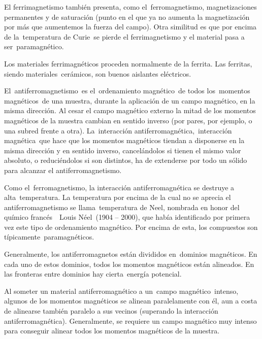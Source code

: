 \begin{footnotesize}
El ferrimagnetismo también presenta, como el ferromagnetismo, magnetizaciones permanentes y de saturación (punto en el que ya no aumenta la magnetización por más que aumentemos la fuerza del campo). Otra similitud es que por encima de la temperatura de Curie se pierde el ferrimagnetismo y el material pasa a ser paramagnético.

Los materiales ferrimagnéticos proceden normalmente de la ferrita. Las ferritas, siendo materiales cerámicos, son buenos aislantes eléctricos. 

El antiferromagnetismo es el ordenamiento magnético de todos los momentos magnéticos de una muestra, durante la aplicación de un campo magnético, en la misma dirección. Al cesar el campo magnético externo la mitad de los momentos magnéticos de la muestra cambian en sentido inverso (por pares, por ejemplo, o una subred frente a otra). La interacción antiferromagnética, interacción magnética que hace que los momentos magnéticos tiendan a disponerse en la misma dirección y en sentido inverso, cancelándolos si tienen el mismo valor absoluto, o reduciéndolos si son distintos, ha de extenderse por todo un sólido para alcanzar el antiferromagnetismo.

Como el ferromagnetismo, la interacción antiferromagnética se destruye a alta temperatura. La temperatura por encima de la cual no se aprecia el antiferromagnetismo se llama temperatura de Neel, nombrada en honor del químico francés  Louis Néel (1904 – 2000), que había identificado por primera vez este tipo de ordenamiento magnético. Por encima de esta, los compuestos son típicamente paramagnéticos.

Generalmente, los antiferromagnetos están divididos en dominios magnéticos. En cada uno de estos dominios, todos los momentos magnéticos están alineados. En las fronteras entre dominios hay cierta energía potencial.

Al someter un material antiferromagnético a un campo magnético intenso, algunos de los momentos magnéticos se alinean paralelamente con él, aun a costa de alinearse también paralelo a sus vecinos (superando la interacción antiferromagnética). Generalmente, se requiere un campo magnético muy intenso para conseguir alinear todos los momentos magnéticos de la muestra.



\end{footnotesize}
